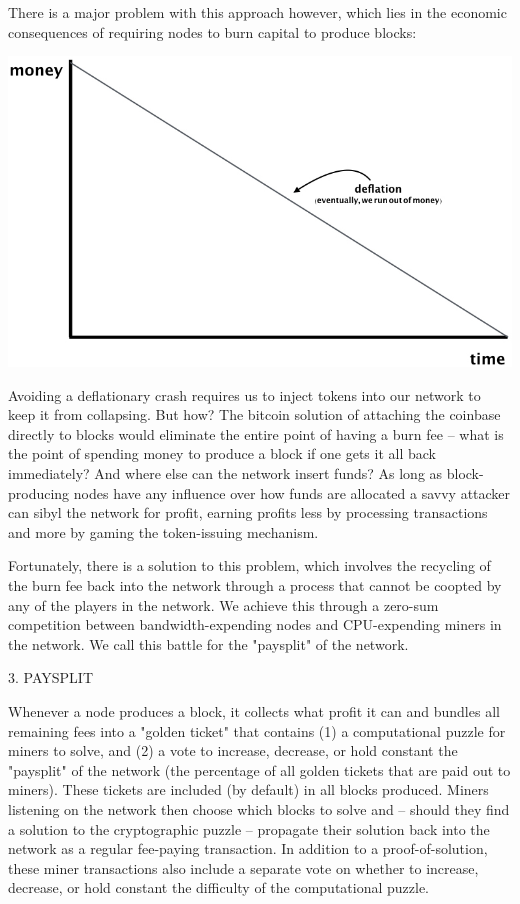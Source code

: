 \documentclass[12pt, oneside]{article}   	%
\begin{document}
\begin{multicols}{2}
There is a major problem with this approach however, which lies in the economic consequences of requiring nodes to burn capital to produce blocks:

\includegraphics[width=.45\textwidth]{saito4.jpeg}

Avoiding a deflationary crash requires us to inject tokens into our network to keep it from collapsing. But how? The bitcoin solution of attaching the coinbase directly to blocks would eliminate the entire point of having a burn fee -- what is the point of spending money to produce a block if one gets it all back immediately? And where else can the network insert funds? As long as block-producing nodes have any influence over how funds are allocated a savvy attacker can sibyl the network for profit, earning profits less by processing transactions and more by gaming the token-issuing mechanism.

Fortunately, there is a solution to this problem, which involves the recycling of the burn fee back into the network through a process that cannot be coopted by any of the players in the network. We achieve this through a zero-sum competition between bandwidth-expending nodes and CPU-expending miners in the network. We call this battle for the "paysplit" of the network.

3. PAYSPLIT

Whenever a node produces a block, it collects what profit it can and bundles all remaining fees into a "golden ticket" that contains (1) a computational puzzle for miners to solve, and (2) a vote to increase, decrease, or hold constant the "paysplit" of the network (the percentage of all golden tickets that are paid out to miners). These tickets are included (by default) in all blocks produced. Miners listening on the network then choose which blocks to solve and -- should they find a solution to the cryptographic puzzle -- propagate their solution back into the network as a regular fee-paying transaction. In addition to a proof-of-solution, these miner transactions also include a separate vote on whether to increase, decrease, or hold constant the difficulty of the computational puzzle.


\end{multicols}
\end{document}
